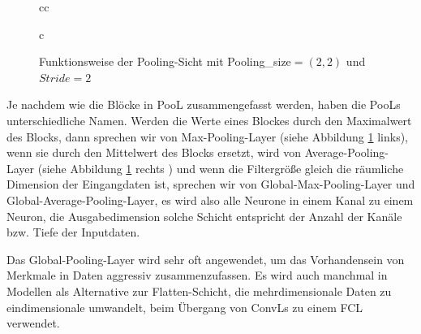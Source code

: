 \documentclass[12pt,a4paper]{scrartcl}
\numberwithin{equation}{section}
\def\Arrow{\raisebox{3\height}{\scalebox{1}{$\xRightarrow[.]{.}$}}}
\begin{document}
\begin{figure}[h]
\begin{tabular}{cc}
\begin{tabular}{c}
\Arrow
				
			\end{tabular}

		
	\end{tabular}
			\caption{Funktionsweise der Pooling-Sicht mit Pooling\_size$ =(2,2) $ und $ Stride =2$}
			\label{fig:Pooling}
\end{figure}


Je nachdem wie die Blöcke in \ac{PooL} zusammengefasst werden, haben die \acsp{PooL} unterschiedliche Namen. Werden die Werte eines Blockes durch den Maximalwert des Blocks, dann sprechen wir von Max-Pooling-Layer (siehe Abbildung \ref{fig:Pooling} links), wenn sie durch den Mittelwert  des Blocks ersetzt, wird von Average-Pooling-Layer (siehe Abbildung \ref{fig:Pooling} rechts ) und wenn die Filtergröße gleich die räumliche Dimension der Eingangdaten ist, sprechen wir von Global-Max-Pooling-Layer und Global-Average-Pooling-Layer, es wird also alle Neurone in einem Kanal zu einem Neuron, die Ausgabedimension solche Schicht entspricht der Anzahl der Kanäle bzw. Tiefe der Inputdaten.

Das Global-Pooling-Layer wird sehr oft angewendet, um das Vorhandensein von Merkmale in Daten aggressiv zusammenzufassen. Es wird auch manchmal in Modellen als Alternative zur Flatten-Schicht, die mehrdimensionale Daten zu eindimensionale umwandelt, beim Übergang von \acsp{ConvL} zu einem \ac{FCL}  verwendet.
\end{document}

